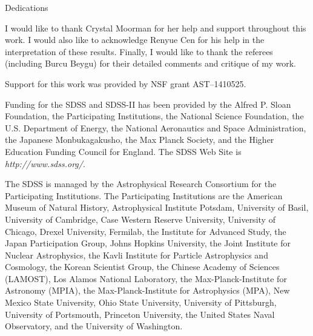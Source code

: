 \begin{preamble}

\iffinal{}{\newpage}


\begin{DUTdedications}
\begin{center}
Dedications
\end{center}
\end{DUTdedications}

\iffinal{}{\newpage}


\begin{acknowledgments}

I would like to thank Crystal Moorman for her help and support throughout this 
work.  I would also like to acknowledge Renyue Cen for his help in the 
interpretation of these results.  Finally, I would like to thank the referees 
(including Burcu Beygu) for their detailed comments and critique of my work.

Support for this work was provided by NSF grant AST--1410525.

Funding for the SDSS and SDSS-II has been provided by the Alfred P. Sloan 
Foundation, the Participating Institutions, the National Science Foundation, the 
U.S. Department of Energy, the National Aeronautics and Space Administration, 
the Japanese Monbukagakusho, the Max Planck Society, and the Higher Education 
Funding Council for England.  The SDSS Web Site is \emph{http://www.sdss.org/}.

The SDSS is managed by the Astrophysical Research Consortium for the 
Participating Institutions.  The Participating Institutions are the American 
Museum of Natural History, Astrophysical Institute Potsdam, University of Basil, 
University of Cambridge, Case Western Reserve University, University of Chicago, 
Drexel University, Fermilab, the Institute for Advanced Study, the Japan 
Participation Group, Johns Hopkins University, the Joint Institute for Nuclear 
Astrophysics, the Kavli Institute for Particle Astrophysics and Cosmology, the 
Korean Scientist Group, the Chinese Academy of Sciences (LAMOST), Los Alamos 
National Laboratory, the Max-Planck-Institute for Astronomy (MPIA), the 
Max-Planck-Institute for Astrophysics (MPA), New Mexico State University, Ohio 
State University, University of Pittsburgh, University of Portsmouth, Princeton 
University, the United States Naval Observatory, and the University of 
Washington.


\end{acknowledgments}
\end{preamble}
